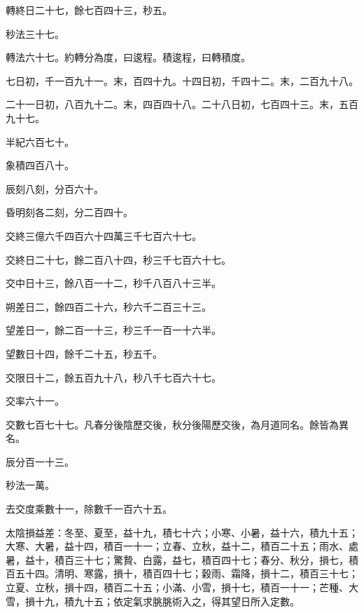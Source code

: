 \begin{pinyinscope}
 轉終日二十七，餘七百四十三，秒五。



 秒法三十七。



 轉法六十七。約轉分為度，曰逡程。積逡程，曰轉積度。



 七日初，千一百九十一。末，百四十九。十四日初，千四十二。末，二百九十八。



 二十一日初，八百九十二。末，四百四十八。二十八日初，七百四十三。末，五百九十七。



 半紀六百七十。



 象積四百八十。



 辰刻八刻，分百六十。



 昏明刻各二刻，分二百四十。



 交終三億六千四百六十四萬三千七百六十七。



 交終日二十七，餘二百八十四，秒三千七百六十七。



 交中日十三，餘八百一十二，秒千八百八十三半。



 朔差日二，餘四百二十六，秒六千二百三十三。



 望差日一，餘二百一十三，秒三千一百一十六半。



 望數日十四，餘千二十五，秒五千。



 交限日十二，餘五百九十八，秒八千七百六十七。



 交率六十一。



 交數七百七十七。凡春分後陰歷交後，秋分後陽歷交後，為月道同名。餘皆為異名。



 辰分百一十三。



 秒法一萬。



 去交度乘數十一，除數千一百六十五。



 太陰損益差：冬至、夏至，益十九，積七十六；小寒、小暑，益十六，積九十五；大寒、大暑，益十四，積百一十一；立春、立秋，益十二，積百二十五；雨水、處暑，益十，積百三十七；驚贄、白露，益七，積百四十七；春分、秋分，損七，積百五十四。清明、寒露，損十，積百四十七；穀雨、霜降，損十二，積百三十七；立夏、立秋，損十四，積百二十五；小滿、小雪，損十七，積百一十一；芒種、大雪，損十九，積九十五；依定氣求朓朓術入之，得其望日所入定數。




\end{pinyinscope}
